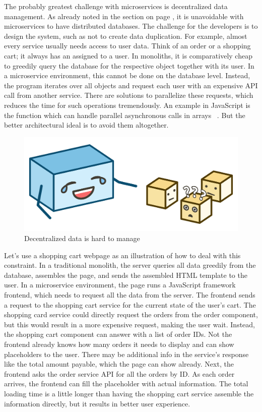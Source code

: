 The probably greatest challenge with microservices is decentralized data management. As already noted in the section on page \pageref{sec:theory:decentralized-data}, it is unavoidable with microservices to have distributed databases. The challenge for the developers is to design the system, such as not to create data duplication. For example, almost every service usually needs access to user data. Think of an order or a shopping cart; it always has an assigned to a user. In monoliths, it is comparatively cheap to greedily query the database for the respective object together with its user. In a microservice environment, this cannot be done on the database level. Instead, the program iterates over all objects and request each user with an expensive API call from another service. There are solutions to parallelize these requests, which reduces the time for such operations tremendously. An example in JavaScript is the  function which can handle parallel asynchronous calls in arrays ~\cite{mdn.2020}. But the better architectural ideal is to avoid them altogether.

\begin{figure}[ht]
  \centering
  \includegraphics[width=0.55\linewidth]{assets/illustration-decentralized-data.png}
  \caption{Decentralized data is hard to manage}
\end{figure}

Let's use a shopping cart webpage as an illustration of how to deal with this constraint. In a traditional monolith, the server queries all data greedily from the database, assembles the page, and sends the assembled HTML template to the user. In a microservice environment, the page runs a JavaScript framework frontend, which needs to request all the data from the server. The frontend sends a request to the shopping cart service for the current state of the user's cart. The shopping card service could directly request the orders from the order component, but this would result in a more expensive request, making the user wait. Instead, the shopping cart component can answer with a list of order IDs. Not the frontend already knows how many orders it needs to display and can show placeholders to the user. There may be additional info in the service's response like the total amount payable, which the page can show already. Next, the frontend asks the order service API for all the orders by ID. As each order arrives, the frontend can fill the placeholder with actual information. The total loading time is a little longer than having the shopping cart service assemble the information directly, but it results in better user experience.


